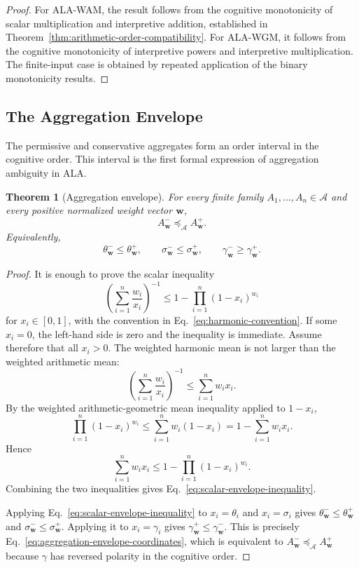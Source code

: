 \documentclass[reqno,final]{amsart}
\theoremstyle{definition}
\theoremstyle{plain}
\newtheorem{theorem}{Theorem}
\theoremstyle{remark}
\providecommand{\cA}{\mathcal{A}}
\providecommand{\preceqA}{\preceq_{\mathcal A}}
\begin{document}
\begin{proof}
For ALA-WAM, the result follows from the cognitive monotonicity of scalar multiplication and interpretive addition, established in Theorem~\ref{thm:arithmetic-order-compatibility}. For ALA-WGM, it follows from the cognitive monotonicity of interpretive powers and interpretive multiplication. The finite-input case is obtained by repeated application of the binary monotonicity results.
\end{proof}

\subsection{The Aggregation Envelope}
\label{subsec:aggregation-envelope-theorem}

The permissive and conservative aggregates form an order interval in the cognitive order. This interval is the first formal expression of aggregation ambiguity in ALA.

\begin{theorem}[Aggregation envelope]
\label{thm:aggregation-envelope}
For every finite family \(A_1,\ldots,A_n\in\cA\) and every positive normalized weight vector \(\mathbf{w}\),
\[
A_{\mathbf{w}}^{-}\preceqA A_{\mathbf{w}}^{+}.
\]
Equivalently,
\begin{equation}
\theta_{\mathbf{w}}^{-}\le \theta_{\mathbf{w}}^{+},
\qquad
\sigma_{\mathbf{w}}^{-}\le \sigma_{\mathbf{w}}^{+},
\qquad
\gamma_{\mathbf{w}}^{-}\ge \gamma_{\mathbf{w}}^{+}.
\label{eq:aggregation-envelope-coordinates}
\end{equation}
\end{theorem}

\begin{proof}
It is enough to prove the scalar inequality
\begin{equation}
\left(\sum_{i=1}^{n}\frac{w_i}{x_i}\right)^{-1}
\le
1-\prod_{i=1}^{n}(1-x_i)^{w_i}
\label{eq:scalar-envelope-inequality}
\end{equation}
for \(x_i\in[0,1]\), with the convention in Eq.~\eqref{eq:harmonic-convention}. If some \(x_i=0\), the left-hand side is zero and the inequality is immediate. Assume therefore that all \(x_i>0\). The weighted harmonic mean is not larger than the weighted arithmetic mean:
\[
\left(\sum_{i=1}^{n}\frac{w_i}{x_i}\right)^{-1}
\le
\sum_{i=1}^{n}w_i x_i.
\]
By the weighted arithmetic-geometric mean inequality applied to \(1-x_i\),
\[
\prod_{i=1}^{n}(1-x_i)^{w_i}
\le
\sum_{i=1}^{n}w_i(1-x_i)
=
1-\sum_{i=1}^{n}w_i x_i.
\]
Hence
\[
\sum_{i=1}^{n}w_i x_i
\le
1-\prod_{i=1}^{n}(1-x_i)^{w_i}.
\]
Combining the two inequalities gives Eq.~\eqref{eq:scalar-envelope-inequality}.

Applying Eq.~\eqref{eq:scalar-envelope-inequality} to \(x_i=\theta_i\) and \(x_i=\sigma_i\) gives \(\theta_{\mathbf{w}}^{-}\le\theta_{\mathbf{w}}^{+}\) and \(\sigma_{\mathbf{w}}^{-}\le\sigma_{\mathbf{w}}^{+}\). Applying it to \(x_i=\gamma_i\) gives \(\gamma_{\mathbf{w}}^{+}\le\gamma_{\mathbf{w}}^{-}\). This is precisely Eq.~\eqref{eq:aggregation-envelope-coordinates}, which is equivalent to \(A_{\mathbf{w}}^{-}\preceqA A_{\mathbf{w}}^{+}\) because \(\gamma\) has reversed polarity in the cognitive order.
\end{proof}
\end{document}
